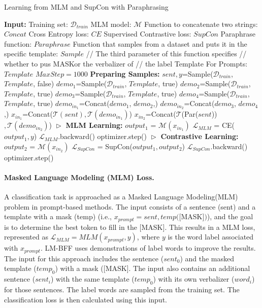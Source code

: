 \documentclass[11pt]{article}
\begin{document}
\begin{algorithm}[!ht]
  \caption{Learning from MLM and SupCon with Paraphrasing}
  \label{alg:mlm-supcon}
  \begin{algorithmic}[1]
    \State \textbf{Input:}
    \State Training set: $\mathcal{D}_{train}$
    \State MLM model: $\mathcal{M}$
    \State Function to concatenate two strings: $Concat$
    \State Cross Entropy loss: $CE$
    \State Supervised Contrastive loss: $SupCon$
    \State Paraphrase function: $Paraphrase$ 
    \State Function that samples from a dataset and puts it in the specific template: $Sample$
    \State // The third parameter of this function specifies
    \State // whether to pus \lbrack MASK\rbrack or the verbalizer of
    \State // the label
    \State Template For Prompts: $Template$
    \State $MaxStep=1000$
    \State \textbf{Preparing Samples:}
        \State $sent,y$=Sample($\mathcal{D}_{train}$, $Template$, false)
        \State $demo_1$=Sample($\mathcal{D}_{train}$, $Template$, true)
        \State $demo_2$=Sample($\mathcal{D}_{train}$, $Template$, true)
        \State $demo_3$=Sample($\mathcal{D}_{train}$, $Template$, true)
        \State $demo_4$=Sample($\mathcal{D}_{train}$, $Template$, true)
        \State $demo_{in_1}$=Concat($demo_1$, $demo_2$,)
        \State $demo_{in_2}$=Concat($demo_3$, $demo_4$,)
        \State $x_{in_1}$=Concat($\mathcal{T}(sent), \mathcal{T}(demo_{in_1})$)
        \State $x_{in_2}$=Concat($\mathcal{T}$(Par($sent$))$, \mathcal{T}(demo_{in_2})$)
        \State $\vartriangleright$ \textbf{MLM Learning:}
        \State $output_1$ = $\mathcal{M}(x_{in_1})$
        \State $\mathcal{L}_{MLM}$ = CE($output_1, y$)
        \State $\mathcal{L}_{MLM}$.backward()
        \State optimizer.step()
        \State $\vartriangleright$ \textbf{Contrastive Learning:}
        \State $output_2$ = $\mathcal{M}(x_{in_2})$
        \State $\mathcal{L}_{SupCon}$ = SupCon($output_1, output_2$)
        \State $\mathcal{L}_{SupCon}$.backward()
        \State optimizer.step()
    \EndFor
  \end{algorithmic}
\end{algorithm}


\paragraph{Masked Language Modeling (MLM) Loss.} A classification task is approached as a Masked Language Modeling(MLM) problem in prompt-based methods. The input consists of a sentence (sent) and a template with a mask (temp) (i.e., $x_{prompt} = sent, temp(\lbrack$MASK$\rbrack)$), and the goal is to determine the best token to fill in the $\lbrack$MASK$\rbrack$. This results in a MLM loss, represented as $\mathcal{L}_{MLM} = MLM(x_{prompt}, y)$, where $y$ is the word label associated with $x_{prompt}$. LM-BFF \cite{gao2021making} uses demonstrations of label words to improve the results. The input for this approach includes the sentence ($sent_0$) and the masked template ($temp_0$) with a mask ([MASK]. The input also contains an additional sentence ($sent_i$) with the same template ($temp_0$) with its own verbalizer ($word_i$) for those sentences. The label words are sampled from the training set. The classification loss is then calculated using this input.
\end{document}
